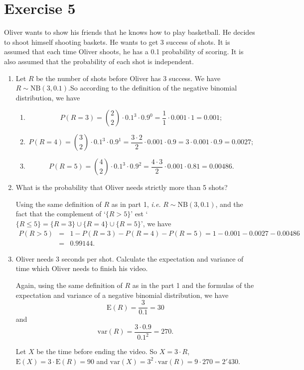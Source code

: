 \documentclass[12pt,thmsa]{article}
\begin{document}
\newpage

\section*{Exercise 5}

Oliver wants to show his friends that he knows how to play basketball. He decides to shoot himself shooting baskets. He wants to get 3 success of shots. It is assumed that each time Oliver shoots, he has a 0.1 probability of scoring. It is also assumed that the probability of each shot is independent.

\begin{enumerate}
\item Let $ R $ be the number of shots before Oliver has 3 success.
We have $R \sim \text{NB}(3,0.1)$.So according to the definition of the negative binomial distribution, we have
\begin{enumerate}
\item \begin{equation*}
P(R=3)= \binom{2}{2} \cdot 0.1^3\cdot 0.9^{0} = \frac{1}{1} \cdot 0.001 \cdot 1 = 0.001;
\end{equation*}
\item \begin{equation*}
P(R=4)= \binom{3}{2} \cdot 0.1^3\cdot 0.9^{1} = \frac{3\cdot 2}{2} \cdot 0.001 \cdot 0.9 = 3 \cdot 0.001 \cdot 0.9 = 0.0027;
\end{equation*}
\item \begin{equation*}
P(R=5)= \binom{4}{2} \cdot 0.1^3\cdot 0.9^{2} = \frac{4\cdot 3}{2} \cdot 0.001 \cdot 0.81 = 0.00486.
\end{equation*} 
\end{enumerate}

\item What is the probability that Oliver needs strictly more than 5 shots?

Using the same definition of $R$ as in part 1, {\it i.e.}  $R \sim \text{NB}(3,0.1)$, and the fact that the complement of  `$\{R> 5\}$' est `$\{R\leq 5\}=\{R=3\}\cup\{R=4\}\cup\{R=5\}$', we have
\begin{eqnarray*}
P(R> 5)&=& 1 - P(R=3)- P(R=4)- P(R=5) = 1 - 0.001 - 0.0027 -0.00486  \\
&=&  0.99144.
\end{eqnarray*}

\item Oliver needs 3 seconds per shot. Calculate the expectation and variance of time
which Oliver needs to finish his video.

Again, using the same definition of $R$ as in the
part 1 and the formulas of the expectation and variance of a
negative binomial distribution, we have
$$
\text{E}(R) =  \frac{3}{0.1} = 30
$$
and
$$
\text{var}(R) = \frac{3\cdot 0.9}{0.1^2} = 270.
$$

Let $ X $ be the time before ending the video. So $X=3\cdot R$,
$\text{E}(X)=3\cdot \text{E}(R) = 90$ and $\text{var}(X)=3^2 \cdot \text{var}(R) = 9 \cdot 270 = 2'430$.
\end{enumerate}
\end{document}

